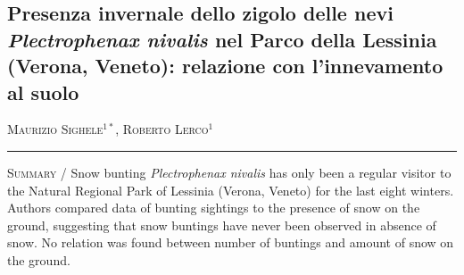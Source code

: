 \setcounter{figure}{0}
\setcounter{table}{0}

\begin{adjustwidth}{-3.5cm}{0cm}
\pagestyle{CIOpage}
\chapter*[Zigolo delle nevi nel Parco della Lessinia e innevamento
al suolo]{Presenza invernale dello zigolo delle nevi
\textbf{\textit{Plectrophenax nivalis}}\textbf{ nel Parco della
Lessinia (Verona, Veneto): relazione con l{\textquoteright}innevamento
al suolo}}

\textsc{Maurizio Sighele}$^{1*}$, \textsc{Roberto Lerco}$^1$  \\

 
\noindent\color{MUSEBLUE}\rule{27cm}{2pt}
\vspace{1cm}
\end{adjustwidth}


{\small
\noindent \textsc{\color{MUSEBLUE} Summary} / Snow bunting \textit{Plectrophenax
nivalis}\textcolor[rgb]{0.14901961,0.14901961,0.14901961}{ has only
been a regular visitor to the Natural Regional Park of Lessinia
(Verona, Veneto) for the last eight winters}. Authors compared data of
bunting sightings to the presence of snow on the ground, suggesting
that snow buntings have never been observed in absence of snow. No
relation was found between number of buntings and amount of snow on the
ground.\\
}
\vspace{1cm}



